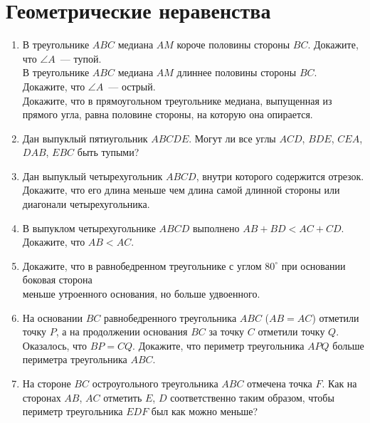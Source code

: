

\section*{Геометрические неравенства}


\begin{enumerate}

\item
\sbp
В треугольнике $ABC$ медиана $AM$ короче половины стороны $BC$.
Докажите, что $\angle A$~--- тупой.
\\
\sbp
В треугольнике $ABC$ медиана $AM$ длиннее половины стороны $BC$.
Докажите, что $\angle A$~--- острый.
\\
\sbp
Докажите, что в прямоугольном треугольнике медиана, выпущенная из прямого угла,
равна половине стороны, на которую она опирается.

\item
Дан выпуклый пятиугольник $ABCDE$.
Могут ли все углы $ACD$, $BDE$, $CEA$, $DAB$, $EBC$ быть тупыми?

\item
Дан выпуклый четырехугольник $ABCD$, внутри которого содержится отрезок.
Докажите, что его длина меньше чем длина самой длинной стороны или диагонали
четырехугольника.

\item
В выпуклом четырехугольнике $ABCD$ выполнено $AB + BD < AC + CD$.
Докажите, что $AB < AC$.

\item
Докажите, что в равнобедренном треугольнике с углом $80^{\circ}$ при основании
боковая сторона
\\
\sbp меньше утроенного основания,
\quad
\sbp но больше удвоенного.

\item
На основании $BC$ равнобедренного треугольника $ABC$ ($AB = AC$) отметили точку
$P$, а на продолжении основания $BC$ за точку $C$ отметили точку $Q$.
Оказалось, что $BP = CQ$.
Докажите, что периметр треугольника $APQ$ больше периметра треугольника $ABC$.

\item
На стороне $BC$ остроугольного треугольника $ABC$ отмечена точка $F$.
Как на сторонах $AB$, $AC$ отметить $E$, $D$ соответственно таким образом,
чтобы периметр треугольника $EDF$ был как можно меньше?

\end{enumerate}

